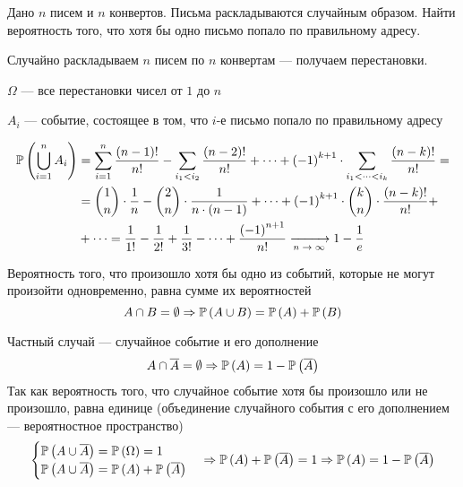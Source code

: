 \begin{comment}
            Обратим внимание на элементы
            $$\probability{\bigcap_{t=1}^{k} \left(A_{i_t}
                                \cap A_{k+1}\right)}$$

    \end{enumerate}
\end{proof}
\end{comment}

\begin{example}
Дано $n$ писем и $n$ конвертов. Письма раскладываются случайным образом.
Найти вероятность того, что хотя бы одно письмо попало по правильному адресу.

Случайно раскладываем $n$ писем по $n$ конвертам --- получаем перестановки.

$\Omega$ --- все перестановки чисел от $1$ до $n$

$A_i$ --- событие, состоящее в том, что
$i$-е письмо попало по правильному адресу

\begin{align*}
    \mathbb{P}\left( \bigcup_{i=1}^n A_i  \right) &=
    \sum_{i=1}^n \frac{\left(n-1\right)!}{n!} -
        \sum_{i_1<i_2} \frac{\left(n-2\right)!}{n!} + \dots +
        \left(-1\right)^{k+1}\cdot
        \sum_{i_1<\dots<i_k} \frac{\left(n-k\right)!}{n!}=\\
    &=
    \binom{1}{n}\cdot\frac{1}{n}-
        \binom{2}{n}\cdot\frac{1}{n\cdot\left(n-1\right)}+\dots+
        \left(-1\right)^{k+1}
            \cdot\binom{k}{n}\cdot\frac{\left(n-k\right)!}{n!}+\\
        &+\dots =
    \frac{1}{1!}-\frac{1}{2!}+\frac{1}{3!}-\dots+
        \frac{\left(-1\right)^{n+1}}{n!}
        \xrightarrow[\text{$n\to\infty$}]{} 1-\frac{1}{e}
\end{align*}
\end{example}
\begin{remark}
    Вероятность того,
    что произошло хотя бы одно из событий,
    которые не могут произойти одновременно,
    равна сумме их вероятностей
    $$A\cap B=\emptyset
        \Rightarrow \mathbb{P}\left( A\cup B \right)
            =\mathbb{P}\left( A \right)+\mathbb{P}\left( B \right)$$

    Частный случай --- случайное событие и его дополнение
    $$A\cap \overline{A}=\emptyset
        \Rightarrow\mathbb{P}\left( A \right)=1-\mathbb{P}\left( \overline{A} \right)$$
    Так как вероятность того, что случайное событие
    хотя бы произошло или не произошло, равна единице
    (объединение случайного события с его дополнением ---
    вероятностное пространство)
    \begin{align*}
        \begin{cases}
            \mathbb{P}\left( A\cup\overline{A} \right)=\mathbb{P}\left( \Omega \right)=1\\
            \mathbb{P}\left( A\cup\overline{A} \right)
                =\mathbb{P}\left( A \right)+\mathbb{P}\left( \overline{A} \right)
        \end{cases}
        \Rightarrow
            \mathbb{P}\left( A \right)+\mathbb{P}\left( \overline{A} \right)=1
        \Rightarrow
            \mathbb{P}\left( A \right)=1-\mathbb{P}\left( \overline{A} \right)
    \end{align*}
\end{remark}
